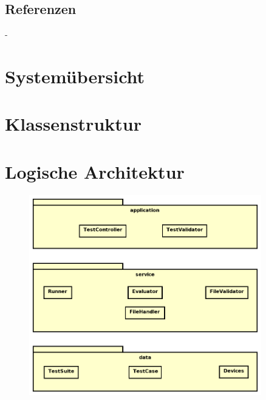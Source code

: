 \documentclass[a4,12pt]{scrartcl}
\begin{document}
\subsection{Referenzen}
\begin{description}
-
\end{description}
\newpage
\section{Systemübersicht}
\newpage
\section{Klassenstruktur}
\newpage
\section{Logische Architektur}
\begin{figure} [H]
	\begin{center}
	\includegraphics[width=0.90\textwidth]{./pictures/architektur.png}
	\label{Bild Referenz}
	\end{center}
\end{figure}
\end{document}
